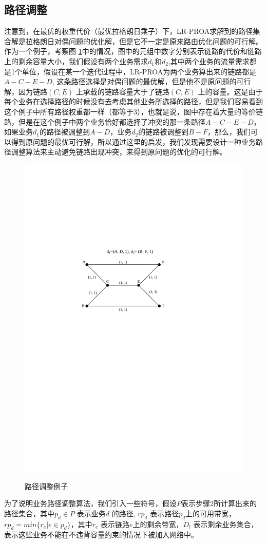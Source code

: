 \subsection{路径调整}
注意到，在最优的权重代价（最优拉格朗日乘子）下，LR-PROA求解到的路径集合解是拉格朗日对偶问题的优化解，但是它不一定是原来路由优化问题的可行解。作为一个例子，考察图 \ref{ppt}中的情况，图中的元组中数字分别表示链路的代价和链路上的剩余容量大小，我们假设有两个业务需求$d_1$和$d_2$,其中两个业务的流量需求都是1个单位，假设在某一个迭代过程中，LR-PROA为两个业务算出来的链路都是$A-C-E-D$, 这条路径选择是对偶问题的最优解，但是他不是原问题的可行解，因为链路$(C,E)$ 上承载的链路容量大于了链路$(C,E)$ 上的容量。这是由于每个业务在选择路径的时候没有去考虑其他业务所选择的路径，但是我们容易看到这个例子中所有路径权重都一样（都等于3），也就是说，图中存在着大量的等价链路，但是在这个例子中两个业务恰好都选择了冲突的那一条路径$A-C-E-D$，如果业务$d_1$的路径被调整到$A-D$，业务$d_2$的链路被调整到$B-F$，那么，我们可以得到原问题的最优可行解，所以通过这里的启发，我们发现需要设计一种业务路径调整算法来主动避免链路出现冲突，来得到原问题的优化的可行解。
\begin{figure}
\setlength{\belowcaptionskip}{-0.1cm}
\begin{center}
{\includegraphics[width=0.4 \textwidth]{figures/PathAdj.pdf}}
\end{center}
\caption{{\footnotesize{路径调整例子}}}
\label{ppt}
\end{figure}
为了说明业务路径调整算法，我们引入一些符号，假设$P$表示步骤2所计算出来的路径集合，其中$p_d\in P$ 表示业务$d$ 的路径, $rp_{d}$ 表示路径$p_d$上的可用带宽，$rp_{d} = min\{r_e | e\in p_d\}$，其中$r_e$ 表示链路$e$上的剩余带宽，$D_l$ 表示剩余业务集合，表示这些业务不能在不违背容量约束的情况下被加入网络中。
